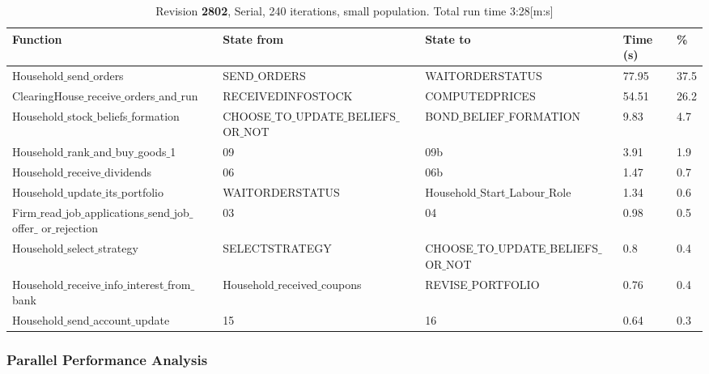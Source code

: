 \begin{landscape}
\begin{table}
\begin{tabular}{|l|l|l|l|l|}\hline
Function & State from & State to & Time (s) & \% \\ \hline
Household$\_$send$\_$orders & SEND$\_$ORDERS & WAITORDERSTATUS &  77.95 & 37.5 \\ \hline
ClearingHouse$\_$receive$\_$orders$\_$and$\_$run & RECEIVEDINFOSTOCK & COMPUTEDPRICES &   54.51 & 26.2 \\ \hline
Household$\_$stock$\_$beliefs$\_$formation & CHOOSE$\_$TO$\_$UPDATE$\_$BELIEFS$\_$OR$\_$NOT & BOND$\_$BELIEF$\_$FORMATION &   9.83 & 4.7 \\ \hline
Household$\_$rank$\_$and$\_$buy$\_$goods$\_$1 & 09 & 09b &   3.91 & 1.9 \\ \hline
Household$\_$receive$\_$dividends & 06 & 06b &   1.47 & 0.7 \\ \hline
Household$\_$update$\_$its$\_$portfolio & WAITORDERSTATUS & Household$\_$Start$\_$Labour$\_$Role &   1.34 & 0.6 \\ \hline
\parbox[t]{7cm}{Firm$\_$read$\_$job$\_$applications$\_$send$\_$job$\_$offer$\_$\\[-4pt]or$\_$rejection} & 03 & 04 &   0.98 & 0.5 \\ \hline
Household$\_$select$\_$strategy & SELECTSTRATEGY & CHOOSE$\_$TO$\_$UPDATE$\_$BELIEFS$\_$OR$\_$NOT &   0.8 & 0.4 \\ \hline
Household$\_$receive$\_$info$\_$interest$\_$from$\_$bank & Household$\_$received$\_$coupons & REVISE$\_$PORTFOLIO &   0.76 & 0.4 \\ \hline
Household$\_$send$\_$account$\_$update & 15 & 16 &  0.64 & 0.3 \\ \hline
\end{tabular}
\caption{Revision \textbf{2802}, Serial, 240 iterations, small population. Total run time 3:28[m:s]}
\end{table}

\end{landscape}

\subsubsection{Parallel Performance Analysis}

